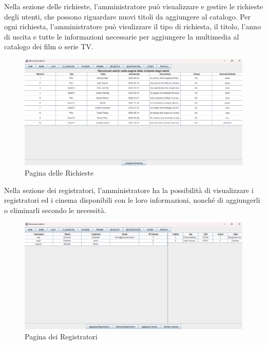 \documentclass[a4paper,12pt]{report}
\begin{document}
Nella sezione delle richieste, l'amministratore può visualizzare e gestire le richieste degli utenti, che possono riguardare nuovi titoli da aggiungere al catalogo. Per ogni richiesta, l'amministratore può visulizzare il tipo di richiesta, il titolo, l'anno di uscita e tutte le informazioni necessarie per aggiungere la multimedia al catalogo dei film o serie TV. \\
\begin{figure}[H]
	\centering
	\includegraphics[width=375pt]{appimg/adminImages/sezionerichieste.png}
	\caption{Pagina delle Richieste}
\end{figure}

Nella sezione dei registratori, l'amministratore ha la possibilità di visualizzare i registratori ed i cinema disponibili con le loro informazioni, nonché di aggiungerli o eliminarli secondo le necessità. \\
\begin{figure}[H]
	\centering
	\includegraphics[width=375pt]{appimg/adminImages/sezioneregistratori.png}
	\caption{Pagina dei Registratori}
\end{figure}
\end{document}
